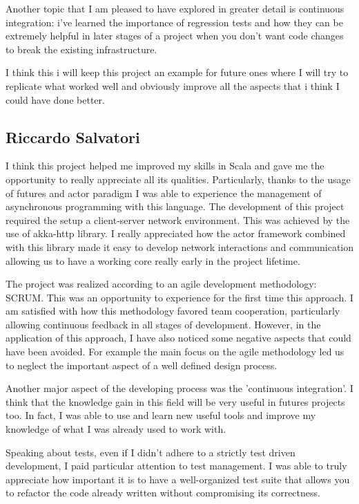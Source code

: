 Another topic that I am pleased to have explored in greater detail is continuous integration: i've learned the importance of regression tests and how they can be extremely helpful in later stages of a project when you don't want code changes to break the existing infrastructure.

I think this i will keep this project an example for future ones where I will try to replicate what worked well and
obviously improve all the aspects that i think I could have done better.




\subsection{Riccardo Salvatori}

I think this project helped me improved my skills in Scala and gave me the opportunity to really appreciate all its qualities. Particularly, thanks to the usage of futures and actor paradigm I was able to experience the management of asynchronous programming with this language. 
The development of this project required the setup a client-server network environment. 
This was achieved by the use of akka-http library. I really appreciated how the actor framework combined with this library made it easy to develop network interactions and communication allowing us to have a working core really early in the project lifetime.

The project was realized according to an agile development methodology: SCRUM. This was an opportunity to experience for the first time this approach.
I am satisfied with how this methodology favored team cooperation, particularly allowing continuous feedback in all stages of development. 
However, in the application of this approach, I have also noticed some negative aspects that could have been avoided. For example the main focus on the agile methodology led us to neglect the important aspect of a well defined design process.

Another major aspect of the developing process was the 'continuous integration'. 
I think that the knowledge gain in this field will be very useful in futures projects too.
In fact, I was able to use and learn new useful tools and improve my knowledge of what I was already used to work with.

Speaking about tests, even if I didn't adhere to a strictly test driven development, 
I paid particular attention to test management. 
I was able to truly appreciate how important it is to have a well-organized test suite that allows you to refactor the code already written without compromising its correctness.

